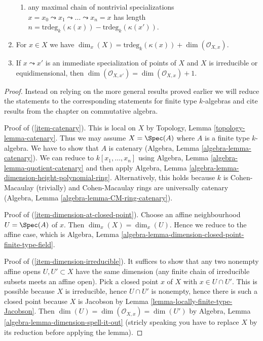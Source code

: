 \begin{lemma}
\begin{enumerate}
\begin{enumerate}
\item any maximal chain of nontrivial specializations
$x = x_0 \leadsto x_1 \leadsto \ldots \leadsto x_n = x$ has
length $n = \text{trdeg}_k(\kappa(x)) - \text{trdeg}_k(\kappa(x'))$.
\end{enumerate}
\item
\label{item-dimension-formula}
For $x \in X$ we have
$\dim_x(X) = \text{trdeg}_k(\kappa(x)) + \dim(\mathcal{O}_{X, x})$.
\item
\label{item-immediate-specialization-local-ring}
If $x \leadsto x'$ is an immediate specialization
of points of $X$ and $X$ is irreducible or equidimensional, then
$\dim(\mathcal{O}_{X, x'}) = \dim(\mathcal{O}_{X, x}) + 1$.
\end{enumerate}
\end{lemma}

\begin{proof}
Instead on relying on the more general results proved earlier
we will reduce the statements to the corresponding statements
for finite type $k$-algebras and cite results from the chapter
on commutative algebra.

\medskip\noindent
Proof of (\ref{item-catenary}). This is local on $X$ by
Topology, Lemma \ref{topology-lemma-catenary}. Thus we may
assume $X = \Spec(A)$ where $A$ is a finite type $k$-algebra.
We have to show that $A$ is catenary
(Algebra, Lemma \ref{algebra-lemma-catenary}).
We can reduce to $k[x_1, \ldots, x_n]$ using
Algebra, Lemma \ref{algebra-lemma-quotient-catenary} and then apply
Algebra, Lemma \ref{algebra-lemma-dimension-height-polynomial-ring}.
Alternatively, this holds because $k$ is Cohen-Macaulay (trivially) and
Cohen-Macaulay rings are universally catenary
(Algebra, Lemma \ref{algebra-lemma-CM-ring-catenary}).

\medskip\noindent
Proof of (\ref{item-dimension-at-closed-point}). Choose an affine
neighbourhood $U = \Spec(A)$ of $x$. Then $\dim_x(X) = \dim_x(U)$.
Hence we reduce to the affine case, which is
Algebra, Lemma \ref{algebra-lemma-dimension-closed-point-finite-type-field}.

\medskip\noindent
Proof of (\ref{item-dimension-irreducible}). It suffices to show that
any two nonempty affine opens $U, U' \subset X$ have the same dimension
(any finite chain of irreducible subsets meets an affine open).
Pick a closed point $x$ of $X$ with $x \in U \cap U'$. This is possible
because $X$ is irreducible, hence $U \cap U'$ is nonempty, hence there is
such a closed point because $X$ is Jacobson by
Lemma \ref{lemma-locally-finite-type-Jacobson}. Then
$\dim(U) = \dim(\mathcal{O}_{X, x}) = \dim(U')$ by
Algebra, Lemma \ref{algebra-lemma-dimension-spell-it-out}
(stricly speaking you have to replace $X$ by its reduction before
applying the lemma).


\end{proof}
